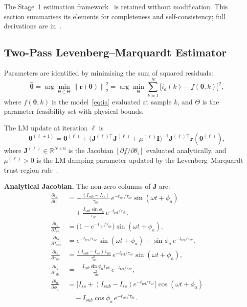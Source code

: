 \documentclass[10pt,journal,twoside]{IEEEtran}
\newcommand{\mat}[1]{\mathbf{#1}}
\begin{document}
The Stage~1 estimation framework~\cite{Eluvathingal2025_TR01} is retained
without modification.  This section summarises its elements for completeness
and self-consistency; full derivations are in~\cite{Eluvathingal2025_TR01}.

\subsection{Two-Pass Levenberg--Marquardt Estimator}
\label{sec:estimation:lm}

Parameters are identified by minimising the sum of squared residuals:
\begin{equation}
\hat{\bm{\theta}} = \arg\min_{\bm{\theta} \in \Theta}
  \left\|\mathbf{r}(\bm{\theta})\right\|_2^2
  = \arg\min_{\bm{\theta}}
  \sum_{k=1}^{N} \bigl[i_a(k) - f(\bm{\theta}, k)\bigr]^2,
\label{eq:lsq}
\end{equation}
where $f(\bm{\theta}, k)$ is the model~\eqref{eq:ia} evaluated at sample $k$,
and $\Theta$ is the parameter feasibility set with physical bounds.

The LM update at iteration $\ell$ is
\begin{equation}
\bm{\theta}^{(\ell+1)} = \bm{\theta}^{(\ell)}
  + \bigl(\mat{J}^{(\ell)\top}\mat{J}^{(\ell)}
           + \mu^{(\ell)}\mat{I}\bigr)^{-1}
    \mat{J}^{(\ell)\top}\mathbf{r}(\bm{\theta}^{(\ell)}),
\label{eq:lm_update}
\end{equation}
where $\mat{J}^{(\ell)} \in \mathbb{R}^{N\times 6}$ is the Jacobian
$[\partial f/\partial\theta_i]$ evaluated analytically, and $\mu^{(\ell)} > 0$
is the LM damping parameter updated by the Levenberg--Marquardt trust-region
rule~\cite{Marquardt1963}.

\textbf{Analytical Jacobian.}  The non-zero columns of $\mat{J}$ are:
\begin{align}
\frac{\partial i_a}{\partial t_0}
  &= -\frac{(I_{sub}-I_{ss})}{\tau_{ac}}\,
     e^{-t_{\mathrm{rel}}/\tau_{ac}}\sin(\omega t+\phi_a)
     \nonumber\\
  &\quad + \frac{I_{sub}\sin\phi_a}{\tau_{dc}}\,e^{-t_{\mathrm{rel}}/\tau_{dc}},
\label{eq:J_t0}\\
\frac{\partial i_a}{\partial I_{ss}}
  &= \bigl(1 - e^{-t_{\mathrm{rel}}/\tau_{ac}}\bigr)\sin(\omega t+\phi_a),
\label{eq:J_Iss}\\
\frac{\partial i_a}{\partial I_{sub}}
  &= e^{-t_{\mathrm{rel}}/\tau_{ac}}\sin(\omega t+\phi_a)
     - \sin\phi_a\,e^{-t_{\mathrm{rel}}/\tau_{dc}},
\label{eq:J_Isub}\\
\frac{\partial i_a}{\partial \tau_{ac}}
  &= \frac{(I_{sub}-I_{ss})\,t_{\mathrm{rel}}}{\tau_{ac}^2}\,
     e^{-t_{\mathrm{rel}}/\tau_{ac}}\sin(\omega t+\phi_a),
\label{eq:J_tauac}\\
\frac{\partial i_a}{\partial \tau_{dc}}
  &= -\frac{I_{sub}\sin\phi_a\,t_{\mathrm{rel}}}{\tau_{dc}^2}\,
     e^{-t_{\mathrm{rel}}/\tau_{dc}},
\label{eq:J_taudc}\\
\frac{\partial i_a}{\partial \phi_a}
  &= \bigl[I_{ss}+(I_{sub}-I_{ss})e^{-t_{\mathrm{rel}}/\tau_{ac}}\bigr]
     \cos(\omega t+\phi_a)
     \nonumber\\
  &\quad - I_{sub}\cos\phi_a\,e^{-t_{\mathrm{rel}}/\tau_{dc}}.
\label{eq:J_phia}
\end{align}
\end{document}
